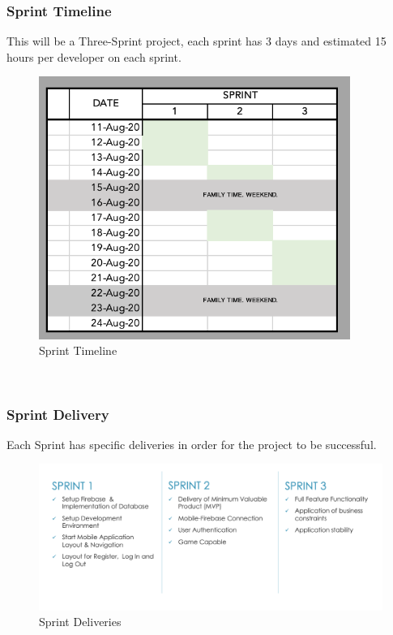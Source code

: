 \documentclass{article}
\begin{document}
        \subsubsection{Sprint Timeline}
        This will be a Three-Sprint project, each sprint has 3 days and estimated 15 hours per developer on each sprint.\\
        \begin{figure}[h]
        \centering
        \includegraphics[width=4in]{images/Sprint Timeline.png}
        \caption{Sprint Timeline}
        \end{figure} 
        ~\\
        \newpage
        \subsubsection{Sprint Delivery}
        Each Sprint has specific deliveries in order for the project to be successful.\\
        \begin{figure}[h]
            \centering
            \includegraphics[width=5.5in]{images/Sprint Deliveries.png}
            \caption{Sprint Deliveries}
        \end{figure}
        \\
        ~\\
    \newpage
\end{document}
